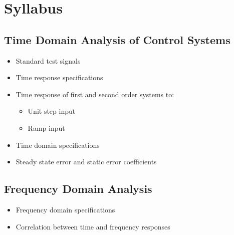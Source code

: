 \documentclass[../course]{subfiles}
\begin{document}
\section{Syllabus}

\subsection{Time Domain Analysis of Control Systems}

\begin{itemize}

    \item Standard test signals
    \item Time response specifications
    \item Time response of first and second order systems to:

        \begin{itemize}

            \item Unit step input
            \item Ramp input

        \end{itemize}

    \item Time domain specifications
    \item Steady state error and static error coefficients

\end{itemize}

\subsection{Frequency Domain Analysis}

\begin{itemize}

    \item Frequency domain specifications
    \item Correlation between time and frequency responses

\end{itemize}
\end{document}
